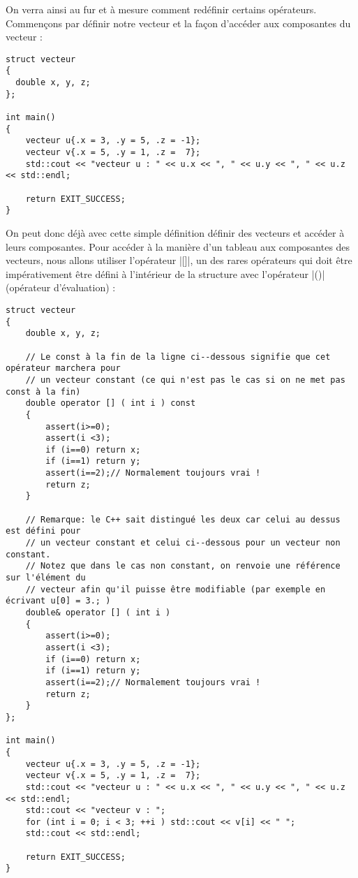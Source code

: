 On verra ainsi au fur et à mesure comment redéfinir certains opérateurs. Commençons par définir notre vecteur et la façon d'accéder aux composantes du vecteur :

\begin{lstlisting}[caption=définition d'un vecteur en trois dimensions]
struct vecteur
{
  double x, y, z;
};

int main()
{
    vecteur u{.x = 3, .y = 5, .z = -1};
    vecteur v{.x = 5, .y = 1, .z =  7};
    std::cout << "vecteur u : " << u.x << ", " << u.y << ", " << u.z << std::endl;

    return EXIT_SUCCESS;
}
\end{lstlisting}

On peut donc déjà avec cette simple définition définir des vecteurs et accéder à leurs composantes. Pour accéder à la manière d'un tableau aux composantes des vecteurs, nous allons utiliser l'opérateur |[]|, un des rares opérateurs qui doit être impérativement être défini à l'intérieur de la structure avec l'opérateur |()| (opérateur d'évaluation) :

\begin{lstlisting}[caption=définition d'un vecteur en trois dimensions avec opérateur d'accés]
struct vecteur
{
    double x, y, z;

    // Le const à la fin de la ligne ci--dessous signifie que cet opérateur marchera pour
    // un vecteur constant (ce qui n'est pas le cas si on ne met pas const à la fin)
    double operator [] ( int i ) const
    {
        assert(i>=0);
        assert(i <3);
        if (i==0) return x;
        if (i==1) return y;
        assert(i==2);// Normalement toujours vrai !
        return z;
    }

    // Remarque: le C++ sait distingué les deux car celui au dessus est défini pour
    // un vecteur constant et celui ci--dessous pour un vecteur non constant.
    // Notez que dans le cas non constant, on renvoie une référence sur l'élément du
    // vecteur afin qu'il puisse être modifiable (par exemple en écrivant u[0] = 3.; )
    double& operator [] ( int i )
    {
        assert(i>=0);
        assert(i <3);
        if (i==0) return x;
        if (i==1) return y;
        assert(i==2);// Normalement toujours vrai !
        return z;        
    }
};

int main()
{
    vecteur u{.x = 3, .y = 5, .z = -1};
    vecteur v{.x = 5, .y = 1, .z =  7};
    std::cout << "vecteur u : " << u.x << ", " << u.y << ", " << u.z << std::endl;
    std::cout << "vecteur v : ";
    for (int i = 0; i < 3; ++i ) std::cout << v[i] << " ";
    std::cout << std::endl;

    return EXIT_SUCCESS;
}
\end{lstlisting}

